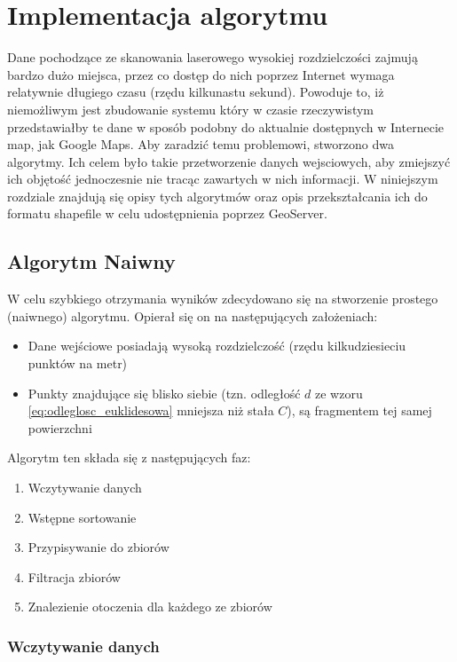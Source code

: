 \chapter{Implementacja algorytmu}

Dane pochodzące ze skanowania laserowego wysokiej rozdzielczości zajmują bardzo dużo miejsca, przez co
dostęp do nich poprzez Internet wymaga relatywnie długiego czasu (rzędu kilkunastu sekund). Powoduje to,
iż niemożliwym jest zbudowanie systemu który w czasie rzeczywistym przedstawiałby te dane w sposób podobny
do aktualnie dostępnych w Internecie map, jak Google Maps. Aby zaradzić temu problemowi, stworzono dwa algorytmy.
Ich celem było takie przetworzenie danych wejsciowych, aby zmiejszyć ich objętość jednoczesnie nie tracąc zawartych w nich informacji.
W niniejszym rozdziale znajdują się opisy tych algorytmów oraz opis przekształcania ich do formatu shapefile w celu udostępnienia
poprzez GeoServer.

\section{Algorytm Naiwny}

W celu szybkiego otrzymania wyników zdecydowano się na stworzenie prostego (naiwnego) algorytmu. Opierał się on na następujących założeniach:
\begin{itemize}
    \item Dane wejściowe posiadają wysoką rozdzielczość (rzędu kilkudziesieciu punktów na metr)
    \item Punkty znajdujące się blisko siebie (tzn. odległość $d$ ze wzoru \ref{eq:odleglosc_euklidesowa} mniejsza niż stała $C$), są fragmentem tej samej powierzchni
\end{itemize}

\noindent Algorytm ten składa się z następujących faz:
\begin{enumerate}
    \item Wczytywanie danych
    \item Wstępne sortowanie
    \item Przypisywanie do zbiorów
    \item Filtracja zbiorów
    \item Znalezienie otoczenia dla każdego ze zbiorów
\end{enumerate}

\subsection{Wczytywanie danych}

